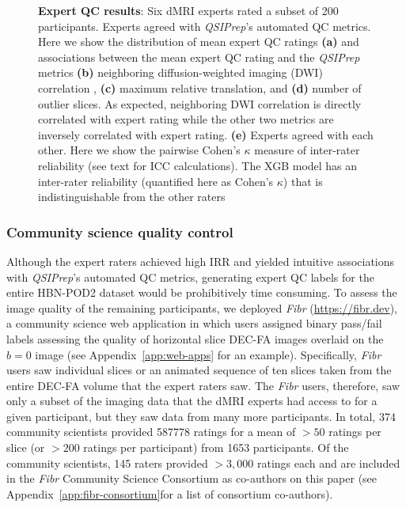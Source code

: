 \documentclass[fleqn,10pt,inline]{wlscirep}
\begin{document}
\begin{figure}[tbp]
\begin{subfigure}{.4\linewidth}
    \end{subfigure}
    \caption{%
        {\bf Expert QC results}:
        Six dMRI experts rated a subset of \num{200} participants.  Experts agreed
        with \emph{QSIPrep}'s automated QC metrics.  Here we show the
        distribution of mean expert QC ratings \textbf{(a)} and associations
        between the mean expert QC rating and the \emph{QSIPrep} metrics
        \textbf{(b)} neighboring diffusion-weighted imaging (DWI) correlation 
        \cite{yeh2019-kb}, \textbf{(c)} maximum relative translation, and
        \textbf{(d)} number of outlier slices. As expected, neighboring DWI correlation is directly
        correlated with expert rating while the other two metrics are inversely
        correlated with expert rating.
        \textbf{(e)} Experts agreed with each other. Here we show the pairwise
        Cohen's $\kappa$ measure of inter-rater reliability (see text for ICC
        calculations). The XGB model has an inter-rater reliability (quantified
        here as Cohen's $\kappa$) that is indistinguishable from the other
        raters
    }
    \label{fig:expert-qc}
\end{figure}

\subsubsection*{Community science quality control}

Although the expert raters achieved high IRR and yielded intuitive associations
with \emph{QSIPrep}'s automated QC metrics, generating expert QC labels for the
entire HBN-POD2 dataset would be prohibitively time consuming. To assess the
image quality of the remaining participants, we deployed \emph{Fibr}
(\url{https://fibr.dev}), a community science web application in which users
assigned binary pass/fail labels assessing the quality of horizontal slice DEC-FA
images overlaid on the $b=0$ image (see Appendix~\ref{app:web-apps} for an example).
Specifically, \emph{Fibr} users saw individual
slices or an animated sequence of ten slices taken from the entire DEC-FA volume
that the expert raters saw. The \emph{Fibr} users, therefore, saw only a subset of
the imaging data that the dMRI experts had access to for a given participant, but they
saw data from many more participants. In total, \num{374} community scientists provided
\num{587778} ratings for a mean of $>50$ ratings per slice (or $>200$ ratings
per participant) from \num{1653} participants. Of the community scientists, \num{145}
raters provided $>3,000$ ratings each and are included in the \emph{Fibr} Community
Science Consortium as co-authors on this paper \cite{Ward-Fear2020-zq} (see Appendix~\ref{app:fibr-consortium}for a list of consortium co-authors).
\end{document}
